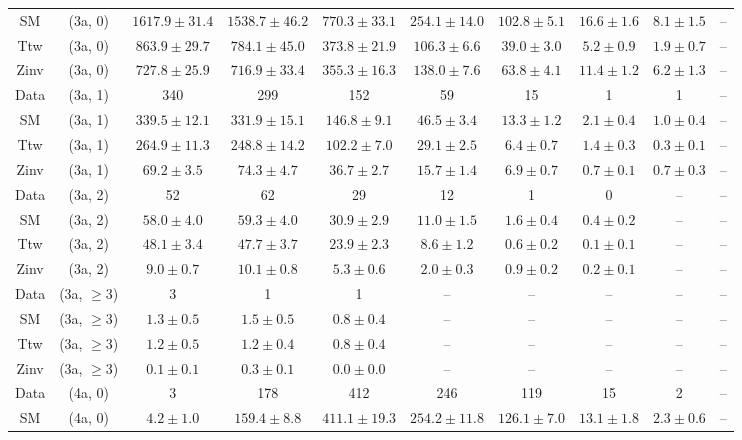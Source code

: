 \begin{table}[h!]
{\begin{tabular}{cccccccccc}
	SM & (3a, 0) & $1617.9\pm 31.4$ & $1538.7\pm 46.2$ & $770.3\pm 33.1$ & $254.1\pm 14.0$ & $102.8\pm 5.1$ & $16.6\pm 1.6$ & $8.1\pm 1.5$ & -- \\[0.5ex] 
	Ttw & (3a, 0) & $863.9\pm 29.7$ & $784.1\pm 45.0$ & $373.8\pm 21.9$ & $106.3\pm 6.6$ & $39.0\pm 3.0$ & $5.2\pm 0.9$ & $1.9\pm 0.7$ & -- \\[0.5ex] 
	Zinv & (3a, 0) & $727.8\pm 25.9$ & $716.9\pm 33.4$ & $355.3\pm 16.3$ & $138.0\pm 7.6$ & $63.8\pm 4.1$ & $11.4\pm 1.2$ & $6.2\pm 1.3$ & -- \\[0.5ex] 
	Data & (3a, 1) & 340 & 299 & 152 & 59 & 15 & 1 & 1 & -- \\[0.5ex] 
	SM & (3a, 1) & $339.5\pm 12.1$ & $331.9\pm 15.1$ & $146.8\pm 9.1$ & $46.5\pm 3.4$ & $13.3\pm 1.2$ & $2.1\pm 0.4$ & $1.0\pm 0.4$ & -- \\[0.5ex] 
	Ttw & (3a, 1) & $264.9\pm 11.3$ & $248.8\pm 14.2$ & $102.2\pm 7.0$ & $29.1\pm 2.5$ & $6.4\pm 0.7$ & $1.4\pm 0.3$ & $0.3\pm 0.1$ & -- \\[0.5ex] 
	Zinv & (3a, 1) & $69.2\pm 3.5$ & $74.3\pm 4.7$ & $36.7\pm 2.7$ & $15.7\pm 1.4$ & $6.9\pm 0.7$ & $0.7\pm 0.1$ & $0.7\pm 0.3$ & -- \\[0.5ex] 
	Data & (3a, 2) & 52 & 62 & 29 & 12 & 1 & 0 & -- & -- \\[0.5ex] 
	SM & (3a, 2) & $58.0\pm 4.0$ & $59.3\pm 4.0$ & $30.9\pm 2.9$ & $11.0\pm 1.5$ & $1.6\pm 0.4$ & $0.4\pm 0.2$ & -- & -- \\[0.5ex] 
	Ttw & (3a, 2) & $48.1\pm 3.4$ & $47.7\pm 3.7$ & $23.9\pm 2.3$ & $8.6\pm 1.2$ & $0.6\pm 0.2$ & $0.1\pm 0.1$ & -- & -- \\[0.5ex] 
	Zinv & (3a, 2) & $9.0\pm 0.7$ & $10.1\pm 0.8$ & $5.3\pm 0.6$ & $2.0\pm 0.3$ & $0.9\pm 0.2$ & $0.2\pm 0.1$ & -- & -- \\[0.5ex] 
	Data & (3a, $\ge3$) & 3 & 1 & 1 & -- & -- & -- & -- & -- \\[0.5ex] 
	SM & (3a, $\ge3$) & $1.3\pm 0.5$ & $1.5\pm 0.5$ & $0.8\pm 0.4$ & -- & -- & -- & -- & -- \\[0.5ex] 
	Ttw & (3a, $\ge3$) & $1.2\pm 0.5$ & $1.2\pm 0.4$ & $0.8\pm 0.4$ & -- & -- & -- & -- & -- \\[0.5ex] 
	Zinv & (3a, $\ge3$) & $0.1\pm 0.1$ & $0.3\pm 0.1$ & $0.0\pm 0.0$ & -- & -- & -- & -- & -- \\[0.5ex] 
	Data & (4a, 0) & 3 & 178 & 412 & 246 & 119 & 15 & 2 & -- \\[0.5ex] 
	SM & (4a, 0) & $4.2\pm 1.0$ & $159.4\pm 8.8$ & $411.1\pm 19.3$ & $254.2\pm 11.8$ & $126.1\pm 7.0$ & $13.1\pm 1.8$ & $2.3\pm 0.6$ & -- \\[0.5ex] 

\end{tabular}}
\end{table}
